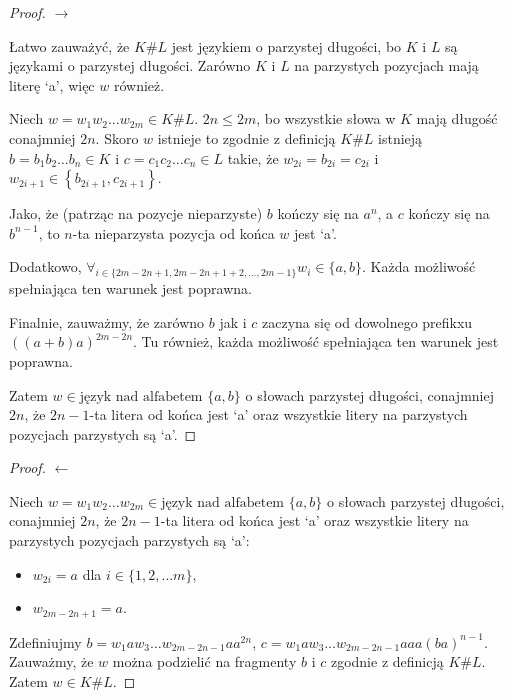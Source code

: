 \documentclass{article}
\theoremstyle{definition}
\theoremstyle{remark}
\begin{document}
\begin{proof}

    \(\rightarrow\)

    Łatwo zauważyć, że \(K \# L\) jest językiem o parzystej długości, bo \(K\) i \(L\) są językami o parzystej długości.
    Zarówno \(K\) i \(L\) na parzystych pozycjach mają literę `a', więc \(w\) również.

    Niech \(w = w_1 w_2 \ldots w_{2m} \in K \# L\). \(2n \leq 2m\), bo wszystkie
    słowa w \(K\) mają długość conajmniej \(2n\). Skoro \(w\) istnieje to zgodnie z
    definicją \(K \# L\) istnieją \(b=b_1 b_2 \ldots b_n \in K\) i \(c=c_1 c_2
    \ldots c_n \in L\) takie, że \(w_{2i} = b_{2i} = c_{2i}\) i \(w_{2i+1} \in
    \left\{ b_{2i+1}, c_{2i+1} \right\}\).

    Jako, że (patrząc na pozycje nieparzyste) \(b\) kończy się na \(a^n\), a \(c\)
    kończy się na \(b^{n-1}\), to \(n\)-ta nieparzysta pozycja od końca \(w\) jest
    `a'.

    Dodatkowo, \( \forall_{i \in \{2m - 2n + 1, 2m - 2n + 1 + 2, \ldots, 2m - 1 \}}
    w_i \in \{ a,b \}\). Każda możliwość spełniająca ten warunek jest poprawna.

    Finalnie, zauważmy, że zarówno \(b\) jak i \(c\) zaczyna się od dowolnego
    prefikxu \( ((a+b)a)^{2m-2n} \). Tu również, każda możliwość spełniająca ten
    warunek jest poprawna.

    Zatem \(w \in \text{język nad alfabetem } \{ a, b \}\) o słowach parzystej
    długości, conajmniej \(2n\), że \(2n-1\)-ta litera od końca jest `a' oraz
    wszystkie litery na parzystych pozycjach parzystych są `a'.

\end{proof}

\begin{proof}

    \(\leftarrow\)

    Niech \(w = w_1 w_2 \ldots w_{2m}\in \text{język nad alfabetem } \{ a, b \}\) o
    słowach parzystej długości, conajmniej \(2n\), że \(2n-1\)-ta litera od końca
    jest `a' oraz wszystkie litery na parzystych pozycjach parzystych są `a':

    \begin{itemize}
        \item \(w_{2i} = a\) dla \(i \in \{1, 2, \ldots m\}\),
        \item \(w_{2m-2n+1} = a\).
    \end{itemize}

    Zdefiniujmy \(b = w_1 a w_3 \ldots w_{2m-2n-1} a a^{2n}\), \(c = w_1 a w_3
    \ldots w_{2m-2n-1} a a a (ba)^{n-1}\). Zauważmy, że \(w\) można podzielić na
    fragmenty \(b\) i \(c\) zgodnie z definicją \(K \# L\). Zatem \(w \in K \# L\).

\end{proof}
\end{document}
